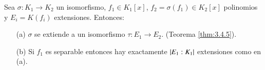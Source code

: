 \begin{thm}\label{thm:3.4.6}
    Sea $\sigma: K_1 \to K_2$ un isomorfismo, $f_1 \in K_1[x]$, $f_2 = \sigma(f_1) \in K_2[x]$ polinomios y $E_i = K(f_i)$ extensiones. Entonces:
    \begin{itemize}
        \item[(a)] $\sigma$ se extiende a un isomorfismo $\tau: E_1 \to E_2$. (Teorema \ref{thm:3.4.5}).
        \item[(b)] Si $f_1$ es separable entonces hay exactamente $\left|E_1:K_1\right|$ extensiones como en (a).
    \end{itemize}
\end{thm}


